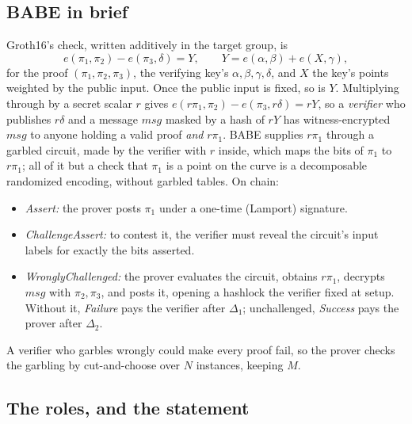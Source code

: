 \documentclass[11pt]{article}
\begin{document}
\subsection{BABE in brief}

Groth16's check, written additively in the target group, is
\[
  e(\pi_1, \pi_2) - e(\pi_3, \delta) = Y, \qquad
  Y = e(\alpha, \beta) + e(X, \gamma),
\]
for the proof $(\pi_1, \pi_2, \pi_3)$, the verifying key's $\alpha,
\beta, \gamma, \delta$, and $X$ the key's points weighted by the public
input. Once the public input is fixed, so is $Y$. Multiplying through by
a secret scalar $r$ gives $e(r\pi_1, \pi_2) - e(\pi_3, r\delta) = rY$, so
a \emph{verifier} who publishes $r\delta$ and a message $\mathit{msg}$
masked by a hash of $rY$ has witness-encrypted $\mathit{msg}$ to anyone
holding a valid proof \emph{and} $r\pi_1$. BABE supplies $r\pi_1$ through
a garbled circuit, made by the verifier with $r$ inside, which maps the
bits of $\pi_1$ to $r\pi_1$; all of it but a check that $\pi_1$ is a
point on the curve is a decomposable randomized encoding, without
garbled tables. On chain:
\begin{itemize}[leftmargin=1.5em]
\item \emph{Assert:} the prover posts $\pi_1$ under a one-time (Lamport)
  signature.
\item \emph{ChallengeAssert:} to contest it, the verifier must reveal the
  circuit's input labels for exactly the bits asserted.
\item \emph{WronglyChallenged:} the prover evaluates the circuit, obtains
  $r\pi_1$, decrypts $\mathit{msg}$ with $\pi_2, \pi_3$, and posts it,
  opening a hashlock the verifier fixed at setup. Without it,
  \emph{Failure} pays the verifier after $\Delta_1$; unchallenged,
  \emph{Success} pays the prover after $\Delta_2$.
\end{itemize}
A verifier who garbles wrongly could make every proof fail, so the
prover checks the garbling by cut-and-choose over $N$ instances, keeping
$M$.

\subsection{The roles, and the statement}
\end{document}
